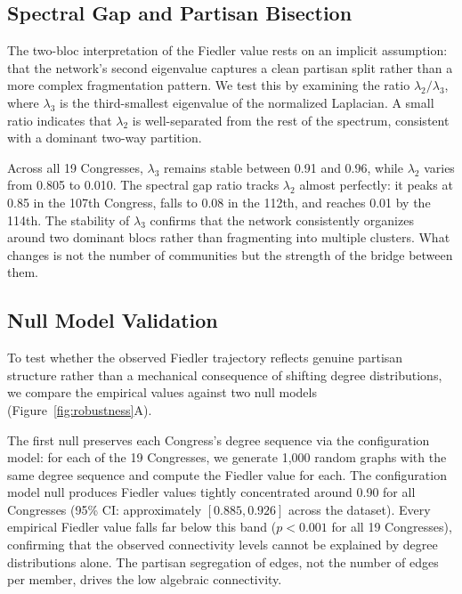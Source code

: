 \documentclass[12pt, a4paper]{article}
\begin{document}
\subsection{Spectral Gap and Partisan Bisection}

The two-bloc interpretation of the Fiedler value rests on an implicit assumption: that the network's second eigenvalue captures a clean partisan split rather than a more complex fragmentation pattern. We test this by examining the ratio $\lambda_2 / \lambda_3$, where $\lambda_3$ is the third-smallest eigenvalue of the normalized Laplacian. A small ratio indicates that $\lambda_2$ is well-separated from the rest of the spectrum, consistent with a dominant two-way partition.

Across all 19 Congresses, $\lambda_3$ remains stable between 0.91 and 0.96, while $\lambda_2$ varies from 0.805 to 0.010. The spectral gap ratio tracks $\lambda_2$ almost perfectly: it peaks at 0.85 in the 107th Congress, falls to 0.08 in the 112th, and reaches 0.01 by the 114th. The stability of $\lambda_3$ confirms that the network consistently organizes around two dominant blocs rather than fragmenting into multiple clusters. What changes is not the number of communities but the strength of the bridge between them.

\subsection{Null Model Validation}

To test whether the observed Fiedler trajectory reflects genuine partisan structure rather than a mechanical consequence of shifting degree distributions, we compare the empirical values against two null models (Figure~\ref{fig:robustness}A).

The first null preserves each Congress's degree sequence via the configuration model: for each of the 19 Congresses, we generate 1,000 random graphs with the same degree sequence and compute the Fiedler value for each. The configuration model null produces Fiedler values tightly concentrated around 0.90 for all Congresses (95\% CI: approximately $[0.885, 0.926]$ across the dataset). Every empirical Fiedler value falls far below this band ($p < 0.001$ for all 19 Congresses), confirming that the observed connectivity levels cannot be explained by degree distributions alone. The partisan segregation of edges, not the number of edges per member, drives the low algebraic connectivity.
\end{document}
